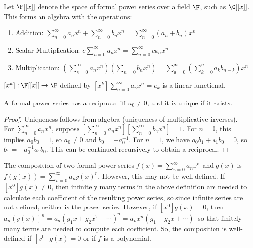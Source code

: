 \documentclass[a4paper]{article}
\begin{document}
\begin{proposition}
Let $\F[[x]]$ denote the space of formal power series over a field $\F$, such as $\C[[x]]$. This forms an algebra with the operations:
\begin{enumerate}[label=(\roman*)]
\item Addition: $\displaystyle\sum_{n=0}^\infty a_nx^n+\sum_{n=0}^\infty b_nx^n=\sum_{n=0}^\infty(a_n+b_n)x^n$
\item Scalar Multiplication: $\displaystyle c\sum_{n=0}^\infty a_nx^n=\sum_{n=0}^\infty ca_nx^n$
\item Multiplication: $\displaystyle\left(\sum_{n=0}^\infty a_nx^n\right)\left(\sum_{n=0}b_nx^n\right)=\sum_{n=0}^\infty\left(\sum_{k=0}^na_kb_{n-k}\right)x^n$
\end{enumerate}
\end{proposition}

\begin{definition}
$[x^k]:\F[[x]]\rightarrow\F$ defined by $[x^k]\sum_{n=0}^\infty a_nx^n=a_k$ is a linear functional.
\end{definition}

\begin{theorem}
A formal power series has a reciprocal iff $a_0\neq0$, and it is unique if it exists.

\begin{hl}
\begin{proof}
Uniqueness follows from algebra (uniqueness of multiplicative inverses). For $\sum_{n=0}^\infty a_nx^n$, suppose $\left[\sum_{n=0}^\infty a_nx^n\right]\left[\sum_{n=0}^\infty b_nx^n\right]=1$. For $n=0$, this implies $a_0b_0=1$, so $a_0\neq0$ and $b_0=-a_0^{-1}$. For $n=1$, we have $a_0b_1+a_1b_0=0$, so $b_1=-a_0^{-1}a_1b_0$. This can be continued recursively to obtain a reciprocal.
\end{proof}
\end{hl}
\end{theorem}

\begin{definition}
The composition of two formal power series $f(x)=\sum_{n=0}^\infty a_nx^n$ and $g(x)$ is $f(g(x))=\sum_{n=0}^\infty a_n g(x)^n$. However, this may not be well-defined. If $[x^0]g(x)\neq0$, then infinitely many terms in the above definition are needed to calculate each coefficient of the resulting power series, so since infinite series are not defined, neither is the power series. However, if $[x^0]g(x)=0$, then $a_n(g(x))^n=a_n(g_1x+g_2x^2+\cdots)^n=a_nx^n(g_1+g_2x+\cdots)$, so that finitely many terms are needed to compute each coefficient. So, the composition is well-defined if $[x^0]g(x)=0$ or if $f$ is a polynomial.
\end{definition}
\end{document}
